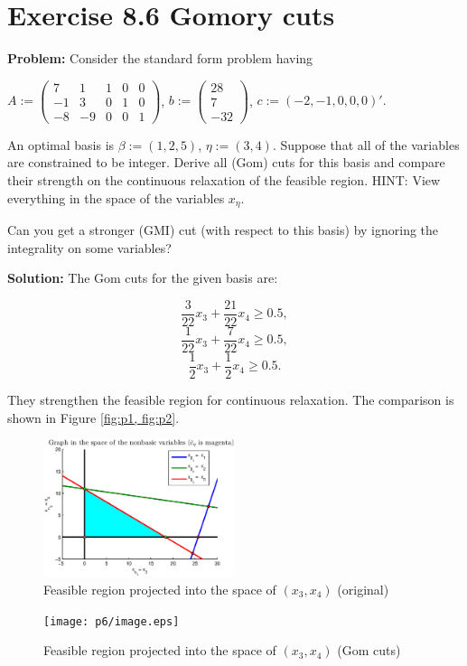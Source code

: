 \section{Exercise 8.6 Gomory cuts}
\textbf{Problem:} Consider the standard form problem having

$A:=\left( \begin{array}{ccccc} 7 & 1 & 1 & 0 & 0 \\ -1 & 3 & 0 & 1 & 0 \\ -8 & -9 & 0 & 0 & 1 \end{array}\right)$, $b:=\left( \begin{array}{c} 28 \\ 7 \\ -32 \end{array}\right)$, $c:=(-2, -1,0,0,0)'.$

An optimal basis is $\beta:=(1,2,5)$, $\eta:=(3,4)$. Suppose that all of the variables are constrained to be integer. Derive all (Gom) cuts for this basis and compare their strength on the continuous relaxation of the feasible region. HINT: View everything in the space of the variables $x_{\eta}$.

Can you get a stronger (GMI) cut (with respect to this basis) by ignoring the integrality on some variables?

\textbf{Solution:} The Gom cuts for the given basis are:

$$ \frac{3}{22}x_3 + \frac{21}{22}x_4 \geq 0.5, $$
$$ \frac{1}{22}x_3 + \frac{7}{22}x_4 \geq 0.5, $$
$$ \frac{1}{2}x_3 + \frac{1}{2}x_4 \geq 0.5. $$

They strengthen the feasible region for continuous relaxation. The comparison is shown in Figure \ref{fig:p1, fig:p2}.

\begin{figure}[h!!]
\includegraphics[width=0.5\textwidth]{p6/original.eps}
\caption{Feasible region projected into the space of $(x_3,x_4)$ (original)}\label{fig:p1}
\end{figure}

\begin{figure}[h!!]
\texttt{[image: p6/image.eps]}
\caption{Feasible region projected into the space of $(x_3,x_4)$ (Gom cuts)}\label{fig:p2}
\end{figure}
